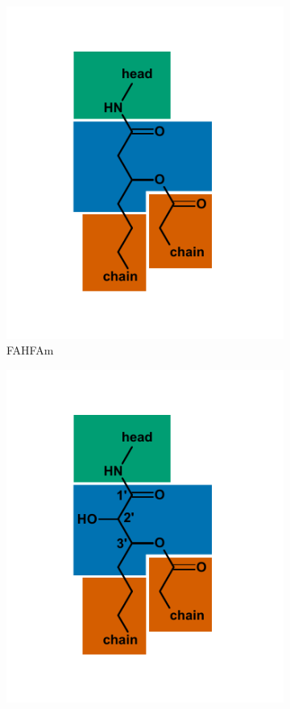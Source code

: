 \begin{figure}[h]
\begin{subfigure}[b]{.3\linewidth}
    	\includegraphics[width=\linewidth]{figs_ch1/FAHFAm}
    	\caption{FAHFAm}
        \label{fig:FAHFAm}
    \end{subfigure}
    \begin{subfigure}[b]{.3\linewidth}
        \includegraphics[width=\linewidth]{figs_ch1/FAHFAm-OH}

\end{subfigure}
\end{figure}
